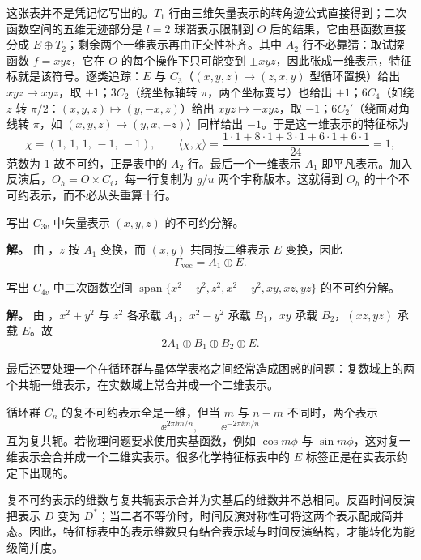 这张表并不是凭记忆写出的。$T_1$ 行由三维矢量表示的转角迹公式直接得到；二次函数空间的五维无迹部分是 $l=2$ 球谐表示限制到 $O$ 后的结果，它由基函数直接分成 $E\oplus T_2$；剩余两个一维表示再由正交性补齐。其中 $A_2$ 行不必靠猜：取试探函数 $f=xyz$，它在 $O$ 的每个操作下只可能变到 $\pm xyz$，因此张成一维表示，特征标就是该符号。逐类追踪：$E$ 与 $C_3$（$(x,y,z)\mapsto(z,x,y)$ 型循环置换）给出 $xyz\mapsto xyz$，取 $+1$；$3C_2$（绕坐标轴转 $\pi$，两个坐标变号）也给出 $+1$；$6C_4$（如绕 $z$ 转 $\pi/2$：$(x,y,z)\mapsto(y,-x,z)$）给出 $xyz\mapsto-xyz$，取 $-1$；$6C_2'$（绕面对角线转 $\pi$，如 $(x,y,z)\mapsto(y,x,-z)$）同样给出 $-1$。于是这一维表示的特征标为
\[
\chi=(1,\,1,\,1,\,-1,\,-1),
\qquad
\langle\chi,\chi\rangle=\frac{1\cdot1+8\cdot1+3\cdot1+6\cdot1+6\cdot1}{24}=1,
\]
范数为 $1$ 故不可约，正是表中的 $A_2$ 行。最后一个一维表示 $A_1$ 即平凡表示。加入反演后，$O_h=O\times C_i$，每一行复制为 $g/u$ 两个宇称版本。这就得到 $O_h$ 的十个不可约表示，而不必从头重算十行。

\begin{workedexample}
写出 $C_{3v}$ 中矢量表示 $(x,y,z)$ 的不可约分解。

\textbf{解。} 由 ，$z$ 按 $A_1$ 变换，而 $(x,y)$ 共同按二维表示 $E$ 变换，因此
\[
\Gamma_{\mathrm{vec}}=A_1\oplus E.
\]
\end{workedexample}


\begin{workedexample}
写出 $C_{4v}$ 中二次函数空间 $\operatorname{span}\{x^2+y^2,z^2,x^2-y^2,xy,xz,yz\}$ 的不可约分解。

\textbf{解。} 由 ，$x^2+y^2$ 与 $z^2$ 各承载 $A_1$，$x^2-y^2$ 承载 $B_1$，$xy$ 承载 $B_2$，$(xz,yz)$ 承载 $E$。故
\[
2A_1\oplus B_1\oplus B_2\oplus E.
\]
\end{workedexample}


最后还要处理一个在循环群与晶体学表格之间经常造成困惑的问题：复数域上的两个共轭一维表示，在实数域上常合并成一个二维表示。

循环群 $C_n$ 的复不可约表示全是一维，但当 $m$ 与 $n-m$ 不同时，两个表示
\[
\ee^{2\pi\ii m/n},
\qquad
\ee^{-2\pi\ii m/n}
\]
互为复共轭。若物理问题要求使用实基函数，例如 $\cos m\phi$ 与 $\sin m\phi$，这对复一维表示会合并成一个二维实表示。很多化学特征标表中的 $E$ 标签正是在实表示约定下出现的。

复不可约表示的维数与复共轭表示合并为实基后的维数并不总相同。反酉时间反演把表示 $D$ 变为 $D^*$；当二者不等价时，时间反演对称性可将这两个表示配成简并态。因此，特征标表中的表示维数只有结合表示域与时间反演结构，才能转化为能级简并度。

